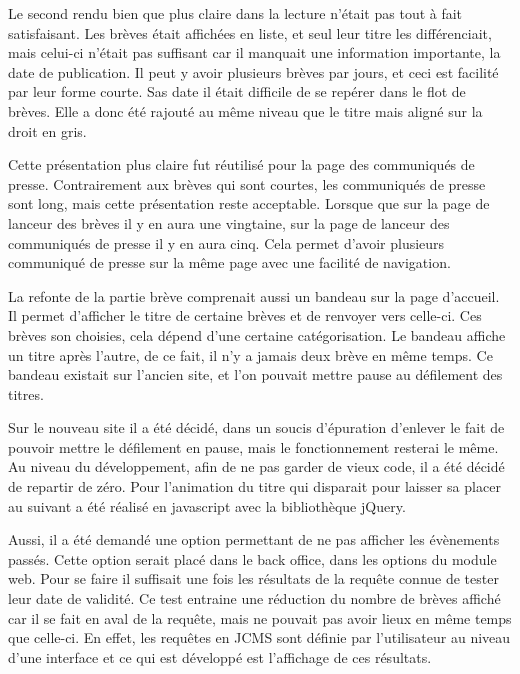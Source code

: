 \documentclass[12pt,a4paper]{article}
\begin{document}
Le second rendu bien que plus claire dans la lecture n'était pas tout à fait satisfaisant. Les brèves était affichées en liste, et seul leur titre les différenciait, mais celui-ci n'était pas suffisant car il manquait une information importante, la date de publication. Il peut y avoir plusieurs brèves par jours, et ceci est facilité par leur forme courte. Sas date il était difficile de se repérer dans le flot de brèves. Elle a donc été rajouté au même niveau que le titre mais aligné sur la droit en gris.\par
\medskip
Cette présentation plus claire fut réutilisé pour la page des communiqués de presse. Contrairement aux brèves qui sont courtes, les communiqués de presse sont long, mais cette présentation reste acceptable. Lorsque que sur la page de lanceur des brèves il y en aura une vingtaine, sur la page de lanceur des communiqués de presse il y en aura cinq. Cela permet d'avoir plusieurs communiqué de presse sur la même page avec une facilité de navigation.\par
\bigskip 
La refonte de la partie brève comprenait aussi un bandeau sur la page d'accueil. Il permet d'afficher le titre de certaine brèves et de renvoyer vers celle-ci. Ces brèves son choisies, cela dépend d'une certaine catégorisation. Le bandeau affiche un titre après l'autre, de ce fait, il n'y a jamais deux brève en même temps. Ce bandeau existait sur l'ancien site, et l'on pouvait mettre pause au défilement des titres.\par 
Sur le nouveau site il a été décidé, dans un soucis d'épuration d'enlever le fait de pouvoir mettre le défilement en pause, mais le fonctionnement resterai le même. Au niveau du développement, afin de ne pas garder de vieux code, il a été décidé de repartir de zéro. Pour l'animation du titre qui disparait pour laisser sa placer au suivant a été réalisé en javascript avec la bibliothèque jQuery.\par 
Aussi, il a été demandé une option permettant de ne pas afficher les évènements passés. Cette option serait placé dans le back office, dans les options du module web. Pour se faire il suffisait une fois les résultats de la requête connue de tester leur date de validité. Ce test entraine une réduction du nombre de brèves affiché car il se fait en aval de la requête, mais ne pouvait pas avoir lieux en même temps que celle-ci. En effet, les requêtes en JCMS sont définie par l'utilisateur au niveau d'une interface et ce qui est développé est l'affichage de ces résultats.\par
\end{document}
